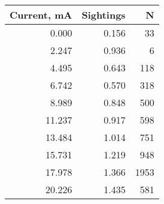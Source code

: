 \begin{tabular}{rrr}
\toprule
 Current, mA &  Sightings &    N \\
\midrule
       0.000 &      0.156 &   33 \\
       2.247 &      0.936 &    6 \\
       4.495 &      0.643 &  118 \\
       6.742 &      0.570 &  318 \\
       8.989 &      0.848 &  500 \\
      11.237 &      0.917 &  598 \\
      13.484 &      1.014 &  751 \\
      15.731 &      1.219 &  948 \\
      17.978 &      1.366 & 1953 \\
      20.226 &      1.435 &  581 \\
\bottomrule
\end{tabular}
